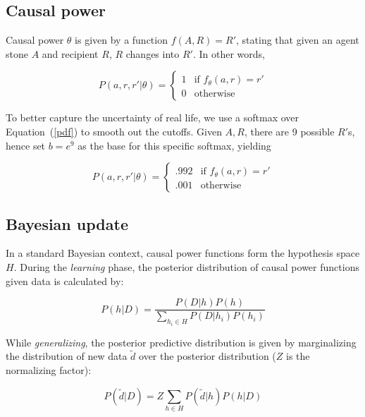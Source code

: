 \documentclass{article}
\begin{document}
\subsection*{Causal power}

Causal power $\theta$ is given by a function $f(A, R) = R'$, stating that given an agent stone $A$ and recipient $R$, $R$ changes into $R'$. In other words,

\begin{equation}\label{pdf}
	P(a, r, r'|\theta) =
	\begin{cases}
		1 &\text{if } f_{\theta}(a, r) = r'\\
		0 &\text{otherwise}
	\end{cases}
\end{equation}

To better capture the uncertainty of real life, we use a softmax over Equation~(\ref{pdf}) to smooth out the cutoffs. Given $A, R$, there are 9 possible $R'$s, hence set $b=e^9$ as the base for this specific softmax, yielding

\begin{equation}\label{spdf}
	P(a, r, r'|\theta) =
	\begin{cases}
		.992 &\text{if } f_{\theta}(a, r) = r'\\
		.001 &\text{otherwise}
	\end{cases}
\end{equation}

\subsection*{Bayesian update}

In a standard Bayesian context, causal power functions form the hypothesis space $H$. During the \emph{learning} phase, the posterior distribution of causal power functions given data is calculated by:

\begin{equation}\label{learning}
	P(h|D) = \frac{P(D|h)P(h)}{\sum_{h_i \in H}P(D|h_i)P(h_i)}
\end{equation}	


While \emph{generalizing}, the posterior predictive distribution is given by marginalizing the distribution of new data $\tilde{d}$ over the posterior distribution ($Z$ is the normalizing factor):

\begin{equation}\label{gen}
	P(\tilde{d}|D) = Z \sum_{h\in H}P(\tilde{d}|h)P(h|D)
\end{equation}
\end{document}
